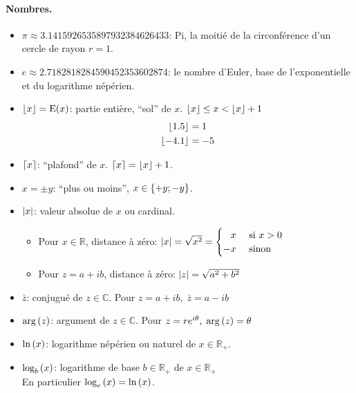 \documentclass[12pt]{article}
\begin{document}
\paragraph{Nombres.}
\begin{itemize}
    \item $\pi \approx 3.1415926535897932384626433$: Pi, la moitié de la circonférence 
        d'un cercle de rayon $r = 1$.
    \item $e   \approx 2.7182818284590452353602874$: le nombre d'Euler, base de l'exponentielle 
        et du logarithme népérien.
    \item $\left\lfloor x \right\rfloor = \text{E}(x)$: partie entière, \enquote{sol} de $x$. 
        $\left\lfloor x \right\rfloor \leq x < \left\lfloor x \right\rfloor + 1$   \\
        \Ex $$
        \begin{aligned}
            \left\lfloor 1.5 \right\rfloor         &= 1                \\
            \left\lfloor -4.1 \right\rfloor        &= -5               \\
        \end{aligned}
        $$
    \item[\In] $\left\lceil x \right\rceil$: \enquote{plafond} de $x$. $\left\lceil x \right\rceil = \left\lfloor x \right\rfloor + 1$.
    \item $x = \pm y$: \enquote{plus ou moins}, $x \in \left\{+y; -y\right\}$.
    \item[\Ii] $\left\lvert x \right\rvert$: valeur absolue de $x$ ou cardinal.
    \begin{itemize}
        \item Pour $x \in \mathbb{R}$, distance à zéro: 
            $\left\lvert x \right\rvert = \sqrt{x^2} = \begin{cases}
                \phantom{-}x  &\text{ si } x > 0 \\
                -x  &\text{ sinon }    \\ 
            \end{cases}$ 
        \item Pour $z = a + ib$, distance à zéro: 
            $\left\lvert z \right\rvert = \sqrt{a^2 + b^2}$
    \end{itemize}
    \item $\bar{z}$: conjugué de $z \in \mathbb{C}$.
        Pour $z = a + ib,\; \bar{z} = a - ib$
    \item $\arg\left(z\right)$: argument de $z \in \mathbb{C}$.
        Pour $z = re^{i\theta},\; \arg\left(z\right) = \theta$
    \item $\ln\left(x\right)$: logarithme népérien ou naturel de $x \in \mathbb{R}_{+}$.
    \item[\Il] $\log_{b}\left(x\right)$: logarithme de base $b \in \mathbb{R}_{+}$ 
        de $x \in \mathbb{R}_{+}$ \\
        En particulier $\log_{e}\left(x\right) = \ln\left(x\right)$.
\end{itemize}
\end{document}
